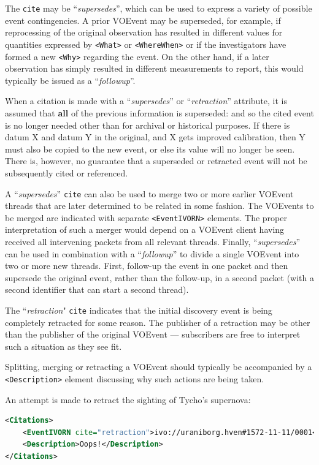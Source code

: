 \documentclass[11pt,a4paper]{ivoa}
\begin{document}
The {\tt cite} may be ``\emph{supersedes}'', which can be used to express a 
variety of possible event contingencies. A prior VOEvent may be superseded, for 
example, if reprocessing of the original observation has resulted in different 
values for quantities expressed by {\tt <What>} or {\tt <WhereWhen>} or if the 
investigators have formed a new {\tt <Why>} regarding the event. On the other 
hand, if a later observation has simply resulted in different measurements to 
report, this would typically be issued as a ``\emph{followup}''. 

When a citation is made with a ``\emph{supersedes}'' or ``\emph{retraction}'' 
attribute, it is assumed that {\bf all} of the previous information is 
superseded: and so the cited event is no longer needed other than for archival 
or historical purposes. If there is datum X and datum Y in the original, and X 
gets improved calibration, then Y must also be copied to the new event, or else 
its value will no longer be seen. There is, however, no guarantee that a 
superseded or retracted event will not be subsequently cited or referenced. 

A ``\emph{supersedes}'' {\tt cite} can also be used to merge two or more earlier
VOEvent threads that are later determined to be related in some fashion. The 
VOEvents to be merged are indicated with separate {\tt <EventIVORN>} elements. 
The proper interpretation of such a merger would depend on a VOEvent client 
having received all intervening packets from all relevant threads. Finally, 
``\emph{supersedes}'' can be used in combination with a ``\emph{followup}'' to 
divide a single VOEvent into two or more new threads. First, follow-up the event
in one packet and then supersede the original event, rather than the follow-up,
in a second packet (with a second identifier that can start a second thread). 

The ``\emph{retraction}" {\tt cite} indicates that the initial discovery event 
is being completely retracted for some reason. The publisher of a retraction may
be other than the publisher of the original VOEvent --- subscribers are free to
interpret such a situation as they see fit. 

Splitting, merging or retracting a VOEvent should typically be accompanied by a
{\tt <Description>} element discussing why such actions are being taken. 

An attempt is made to retract the sighting of Tycho's supernova: 
\begin{lstlisting}[language=XML]
<Citations>
    <EventIVORN cite="retraction">ivo://uraniborg.hven#1572-11-11/0001</EventIVORN>     
    <Description>Oops!</Description>
</Citations> 
\end{lstlisting}
\end{document}
